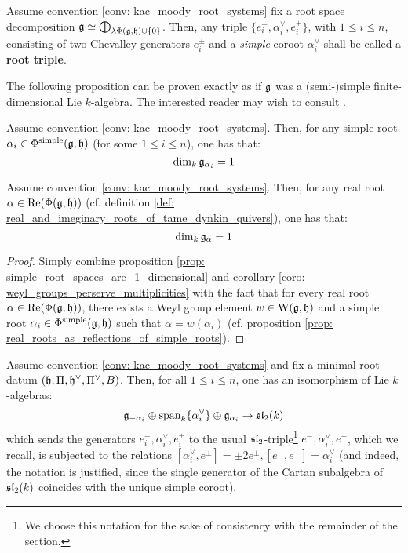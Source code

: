            \begin{convention} \label{conv: root_triples}
                Assume convention \ref{conv: kac_moody_root_systems} fix a root space decomposition $\g \cong \bigoplus_{\lambda \Phi(\g, \h) \cup \{0\}}$. Then, any triple $\{e_i^-, \alpha_i^{\vee}, e_i^+\}$, with $1 \leq i \leq n$, consisting of two Chevalley generators $e_i^{\pm}$ and a \textit{simple} coroot $\alpha_i^{\vee}$ shall be called a \textbf{root triple}.
            \end{convention}
            The following proposition can be proven exactly as if $\g$ was a (semi-)simple finite-dimensional Lie $k$-algebra. The interested reader may wish to consult \cite[Theorem 4.20]{carter_affine_lie_algebras}.
            \begin{proposition} \label{prop: simple_root_spaces_are_1_dimensional}
                Assume convention \ref{conv: kac_moody_root_systems}. Then, for any simple root $\alpha_i \in \Phi^{\simple}(\g, \h)$ (for some $1 \leq i \leq n$), one has that:
                    $$\dim_k \g_{\alpha_i} = 1$$
            \end{proposition}
            \begin{corollary} \label{coro: multiplicities_of_real_roots_of_kac_moody_algebras}
                Assume convention \ref{conv: kac_moody_root_systems}. Then, for any real root $\alpha \in \Re(\Phi(\g, \h))$ (cf. definition \ref{def: real_and_imeginary_roots_of_tame_dynkin_quivers}), one has that:
                    $$\dim_k \g_{\alpha} = 1$$
            \end{corollary}
                \begin{proof}
                    Simply combine proposition \ref{prop: simple_root_spaces_are_1_dimensional} and corollary \ref{coro: weyl_groups_perserve_multiplicities} with the fact that for every real root $\alpha \in \Re(\Phi(\g, \h))$, there exists a Weyl group element $w \in \rmW(\g, \h)$ and a simple root $\alpha_i \in \Phi^{\simple}(\g, \h)$ such that $\alpha = w(\alpha_i)$ (cf. proposition \ref{prop: real_roots_as_reflections_of_simple_roots}).
                \end{proof}
            \begin{corollary} \label{coro: root_triples_are_sl2_triples}
                Assume convention \ref{conv: kac_moody_root_systems} and fix a minimal root datum $(\h, \Pi, \h^{\vee}, \Pi^{\vee}, B)$. Then, for all $1 \leq i \leq n$, one has an isomorphism of Lie $k$-algebras:
                    $$\g_{-\alpha_i} \oplus \span_k \{\alpha_i^{\vee}\} \oplus \g_{\alpha_i} \to \sl_2(k)$$
                which sends the generators $e_i^-, \alpha_i^{\vee}, e_i^+$ to the usual $\sl_2$-triple\footnote{We choose this notation for the sake of consistency with the remainder of the section.} $e^-, \alpha_i^{\vee}, e^+$, which we recall, is subjected to the relations $[\alpha_i^{\vee}, e^{\pm}] = \pm 2 e^{\pm}, [e^-, e^+] = \alpha_i^{\vee}$ (and indeed, the notation is justified, since the single generator of the Cartan subalgebra of $\sl_2(k)$ coincides with the unique simple coroot).
            \end{corollary}
